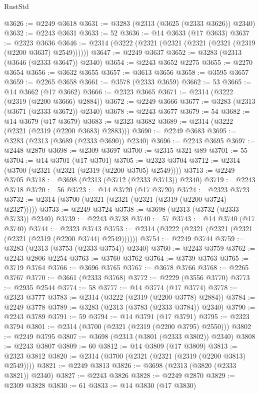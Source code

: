 \begin{lexlean}{RustStd}
\begin{coremodule}
@3626 := @2249 @3618
@3631 := @3283 (@2313 (@3625 (@2333 @3626)) @2340)
@3632 := @2243 @3631
@3633 := 52
@3636 := @14 @3633 (@17 @3633)
@3637 := @2323 @3636
@3646 := @2314 (@3222 (@2321 (@2321 (@2321 (@2321 (@2319 (@2200 @3637) @2549))))))
@3647 := @2249 @3637
@3652 := @3283 (@2313 (@3646 (@2333 @3647)) @2340)
@3654 := @2243 @3652 @2275
@3655 := @2270 @3654
@3656 := @3632 @3655
@3657 := @3613 @3656
@3658 := @3595 @3657
@3659 := @2265 @3658
@3661 := @3578 (@2333 @3659)
@3662 := 53
@3665 := @14 @3662 (@17 @3662)
@3666 := @2323 @3665
@3671 := @2314 (@3222 (@2319 (@2200 @3666) @2884))
@3672 := @2249 @3666
@3677 := @3283 (@2313 (@3671 (@2333 @3672)) @2340)
@3678 := @2243 @3677
@3679 := 54
@3682 := @14 @3679 (@17 @3679)
@3683 := @2323 @3682
@3689 := @2314 (@3222 (@2321 (@2319 (@2200 @3683) @2883)))
@3690 := @2249 @3683
@3695 := @3283 (@2313 (@3689 (@2333 @3690)) @2340)
@3696 := @2243 @3695
@3697 := @2448 @2870
@3698 := @2309 @3697
@3700 := @2315 @321 @89
@3701 := 55
@3704 := @14 @3701 (@17 @3701)
@3705 := @2323 @3704
@3712 := @2314 (@3700 (@2321 (@2321 (@2319 (@2200 @3705) @2549))))
@3713 := @2249 @3705
@3718 := @3698 (@2313 (@3712 (@2333 @3713)) @2340)
@3719 := @2243 @3718
@3720 := 56
@3723 := @14 @3720 (@17 @3720)
@3724 := @2323 @3723
@3732 := @2314 (@3700 (@2321 (@2321 (@2321 (@2319 (@2200 @3724) @2327)))))
@3733 := @2249 @3724
@3738 := @3698 (@2313 (@3732 (@2333 @3733)) @2340)
@3739 := @2243 @3738
@3740 := 57
@3743 := @14 @3740 (@17 @3740)
@3744 := @2323 @3743
@3753 := @2314 (@3222 (@2321 (@2321 (@2321 (@2321 (@2319 (@2200 @3744) @2549))))))
@3754 := @2249 @3744
@3759 := @3283 (@2313 (@3753 (@2333 @3754)) @2340)
@3760 := @2243 @3759
@3762 := @2243 @2806 @2254
@3763 := @3760 @3762
@3764 := @3739 @3763
@3765 := @3719 @3764
@3766 := @3696 @3765
@3767 := @3678 @3766
@3768 := @2265 @3767
@3770 := @3661 (@2333 @3768)
@3772 := @2229 (@3556 @3770)
@3773 := @2935 @2544
@3774 := 58
@3777 := @14 @3774 (@17 @3774)
@3778 := @2323 @3777
@3783 := @2314 (@3222 (@2319 (@2200 @3778) @2884))
@3784 := @2249 @3778
@3789 := @3283 (@2313 (@3783 (@2333 @3784)) @2340)
@3790 := @2243 @3789
@3791 := 59
@3794 := @14 @3791 (@17 @3791)
@3795 := @2323 @3794
@3801 := @2314 (@3700 (@2321 (@2319 (@2200 @3795) @2550)))
@3802 := @2249 @3795
@3807 := @3698 (@2313 (@3801 (@2333 @3802)) @2340)
@3808 := @2243 @3807
@3809 := 60
@3812 := @14 @3809 (@17 @3809)
@3813 := @2323 @3812
@3820 := @2314 (@3700 (@2321 (@2321 (@2319 (@2200 @3813) @2549))))
@3821 := @2249 @3813
@3826 := @3698 (@2313 (@3820 (@2333 @3821)) @2340)
@3827 := @2243 @3826
@3828 := @2249 @2870
@3829 := @2309 @3828
@3830 := 61
@3833 := @14 @3830 (@17 @3830)

\end{coremodule}
\end{lexlean}
